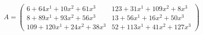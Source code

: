 \documentclass[preview]{standalone}
\begin{document}
\begin{align*}
A = \begin{pmatrix}6 + 64x^{1} + 10x^{2} + 61x^{3} & 123 + 31x^{1} + 109x^{2} + 8x^{3} \\ 8 + 89x^{1} + 93x^{2} + 56x^{3} & 13 + 56x^{1} + 16x^{2} + 50x^{3} \\ 109 + 120x^{1} + 24x^{2} + 38x^{3} & 52 + 113x^{1} + 41x^{2} + 127x^{3}\end{pmatrix}
\end{align*}
\end{document}
